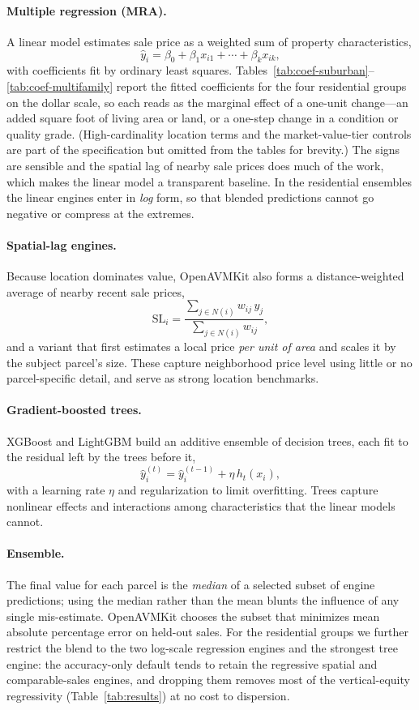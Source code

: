 \documentclass[11pt]{article}
\begin{document}
\paragraph{Multiple regression (MRA).} A linear model estimates sale price as a
weighted sum of property characteristics,
\[ \hat{y}_i = \beta_0 + \beta_1 x_{i1} + \cdots + \beta_k x_{ik}, \]
with coefficients fit by ordinary least squares.
Tables~\ref{tab:coef-suburban}--\ref{tab:coef-multifamily} report the fitted
coefficients for the four residential groups on the dollar scale, so each reads as
the marginal effect of a one-unit change---an added square foot of living area or
land, or a one-step change in a condition or quality grade. (High-cardinality
location terms and the market-value-tier controls are part of the specification but
omitted from the tables for brevity.) The signs are sensible and the spatial lag of
nearby sale prices does much of the work, which makes the linear model a transparent
baseline. In the residential ensembles the linear engines enter in \emph{log} form,
so that blended predictions cannot go negative or compress at the extremes.



\paragraph{Spatial-lag engines.} Because location dominates value, OpenAVMKit also
forms a distance-weighted average of nearby recent sale prices,
\[ \mathrm{SL}_i = \frac{\sum_{j \in N(i)} w_{ij}\,y_j}{\sum_{j \in N(i)} w_{ij}}, \]
and a variant that first estimates a local price \emph{per unit of area} and scales
it by the subject parcel's size. These capture neighborhood price level using
little or no parcel-specific detail, and serve as strong location benchmarks.

\paragraph{Gradient-boosted trees.} XGBoost \citep{xgboost} and LightGBM
\citep{lightgbm} build an additive ensemble of decision trees, each fit to the
residual left by the trees before it,
\[ \hat{y}_i^{(t)} = \hat{y}_i^{(t-1)} + \eta\,h_t(x_i), \]
with a learning rate $\eta$ and regularization to limit overfitting. Trees capture
nonlinear effects and interactions among characteristics that the linear models
cannot.

\paragraph{Ensemble.} The final value for each parcel is the \emph{median} of a
selected subset of engine predictions; using the median rather than the mean blunts
the influence of any single mis-estimate. OpenAVMKit chooses the subset that
minimizes mean absolute percentage error on held-out sales. For the residential
groups we further restrict the blend to the two log-scale regression engines and
the strongest tree engine: the accuracy-only default tends to retain the regressive
spatial and comparable-sales engines, and dropping them removes most of the
vertical-equity regressivity (Table~\ref{tab:results}) at no cost to dispersion.

\FloatBarrier   %


\end{document}
